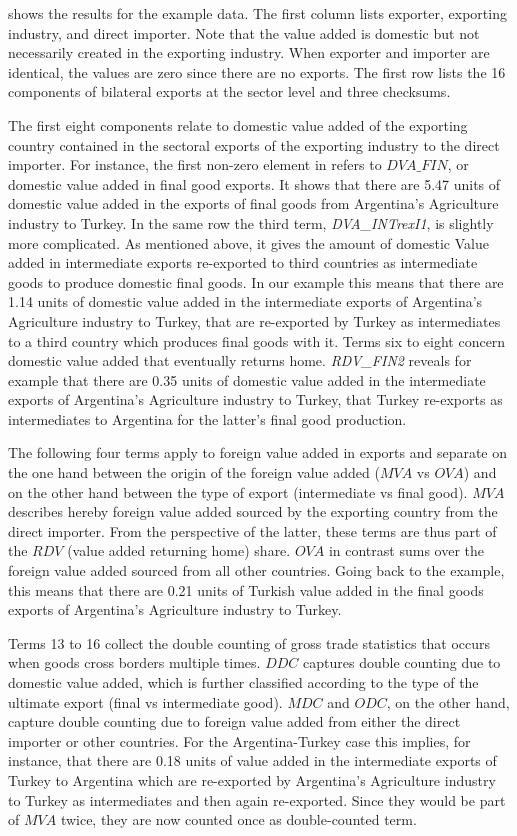\documentclass[a4paper]{article}\usepackage[]{graphicx}\usepackage[]{color}
\begin{document}
 shows the results for the example data. The first
column lists exporter, exporting industry, and direct importer. Note
that the value added is domestic but not necessarily created in the
exporting industry. When exporter and importer are identical, the
values are zero since there are no exports. The first row lists the
16 components of bilateral exports at the sector level and three checksums.

The first eight components relate to domestic value added of the exporting
country contained in the sectoral exports of the exporting industry
to the direct importer. For instance, the first non-zero element in
 refers to $DVA\_FIN$, or domestic value added
in final good exports. It shows that there are 5.47 units of domestic
value added in the exports of final goods from Argentina's Agriculture
industry to Turkey. In the same row the third term, \textit{DVA\_INTrexI1},
is slightly more complicated. As mentioned above, it gives the amount
of domestic Value added in intermediate exports re-exported to third
countries as intermediate goods to produce domestic final goods. In
our example this means that there are 1.14 units of domestic value
added in the intermediate exports of Argentina's Agriculture industry
to Turkey, that are re-exported by Turkey as intermediates to a third
country which produces final goods with it. Terms six to eight concern
domestic value added that eventually returns home. \textit{RDV\_FIN2}
reveals for example that there are 0.35 units of domestic value added
in the intermediate exports of Argentina's Agriculture industry to
Turkey, that Turkey re-exports as intermediates to Argentina for the
latter's final good production.

The following four terms apply to foreign value added in exports and
separate on the one hand between the origin of the foreign value added
($MVA$ vs $OVA$) and on the other hand between the type of export
(intermediate vs final good). $MVA$ describes hereby foreign value
added sourced by the exporting country from the direct importer. From
the perspective of the latter, these terms are thus part of the $RDV$
(value added returning home) share. $OVA$ in contrast sums over the
foreign value added sourced from all other countries. Going back to
the example, this means that there are 0.21 units of Turkish value
added in the final goods exports of Argentina's Agriculture industry
to Turkey.

Terms 13 to 16 collect the double counting of gross trade statistics
that occurs when goods cross borders multiple times. $DDC$ captures
double counting due to domestic value added, which is further classified
according to the type of the ultimate export (final vs intermediate
good). $MDC$ and $ODC$, on the other hand, capture double counting
due to foreign value added from either the direct importer or other
countries. For the Argentina-Turkey case this implies, for instance,
that there are 0.18 units of value added in the intermediate exports
of Turkey to Argentina which are re-exported by Argentina's Agriculture
industry to Turkey as intermediates and then again re-exported. Since
they would be part of $MVA$ twice, they are now counted once as double-counted
term.
\end{document}
